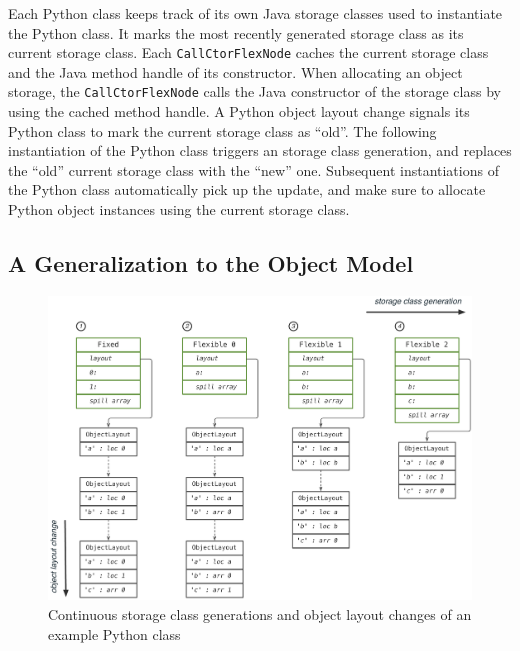 Each Python class keeps track of its own Java storage classes used to instantiate the Python class.
It marks the most recently generated storage class as its current storage class.
Each \texttt{CallCtorFlexNode} caches the current storage class and the Java method handle  of its constructor.
When allocating an object storage, the \texttt{CallCtorFlexNode} calls the Java constructor of the storage class by using the cached method handle.
A Python object layout change signals its Python class to mark the current storage class as ``old''.
The following instantiation of the Python class triggers an storage class generation, and replaces the ``old'' current storage class with the ``new'' one.
Subsequent instantiations of the Python class automatically pick up the update, and make sure to allocate Python object instances using the current storage class.

\subsection{A Generalization to the Object Model}

\begin{figure}
\centering
\includegraphics[scale=.49]{figures/ch5-object-storage-class-generation-and-object-layout-change}
\caption{Continuous storage class generations and object layout changes of an example Python class}
\label{fig:ch5-object-storage-class-generation-and-object-layout-change}
\end{figure}

